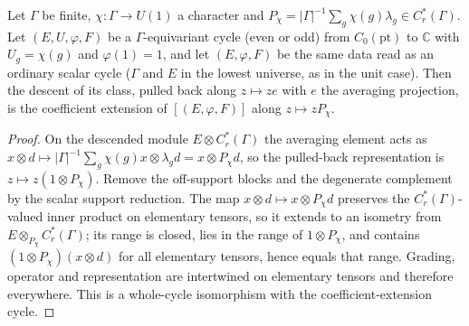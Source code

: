 \begin{proposition}\label{prop:finite-point-compressed-descent}
\leanok
Let $\Gamma$ be finite, $\chi\colon\Gamma\to U(1)$ a character and
$P_\chi=|\Gamma|^{-1}\sum_{g}\chi(g)\lambda_g\in C^*_r(\Gamma)$. Let $(E,U,\varphi,F)$
be a $\Gamma$-equivariant cycle (even or odd) from $C_0(\mathrm{pt})$ to $\mathbb C$
with $U_g=\chi(g)$ and $\varphi(1)=1$, and let $(E,\varphi,F)$ be the same data
read as an ordinary scalar cycle ($\Gamma$ and $E$ in the lowest universe, as in
the unit case). Then the descent of its class, pulled back along
$z\mapsto ze$ with $e$ the averaging projection, is the coefficient extension of
$[(E,\varphi,F)]$ along $z\mapsto zP_\chi$.
\end{proposition}
\begin{proof}
\leanok
On the descended module $E\otimes C^*_r(\Gamma)$ the averaging element acts as
$x\otimes d\mapsto|\Gamma|^{-1}\sum_g\chi(g)x\otimes\lambda_gd=x\otimes P_\chi d$, so
the pulled-back representation is $z\mapsto z(1\otimes P_\chi)$. Remove the
off-support blocks and the degenerate complement by the scalar support reduction.
The map $x\otimes d\mapsto x\otimes P_\chi d$ preserves the $C^*_r(\Gamma)$-valued
inner product on elementary tensors, so it extends to an isometry from
$E\otimes_{P_\chi}C^*_r(\Gamma)$; its range is closed, lies in the range of
$1\otimes P_\chi$, and contains $(1\otimes P_\chi)(x\otimes d)$ for all elementary
tensors, hence equals that range. Grading, operator and representation are
intertwined on elementary tensors and therefore everywhere. This is a whole-cycle
isomorphism with the coefficient-extension cycle.
\end{proof}

